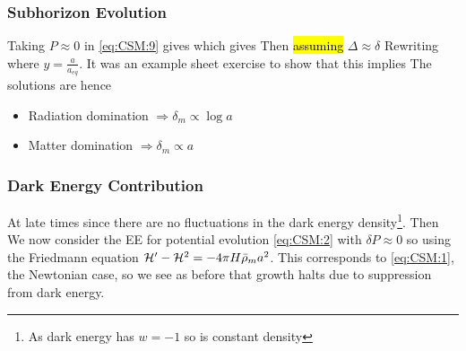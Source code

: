 \documentclass{article}
\begin{document}
\subsubsection*{Subhorizon Evolution} 
Taking $P\approx 0$ in \ref{eq:CSM:9} gives 
which gives 
Then \hl{assuming} $\Delta \approx \delta $ 
Rewriting 
where $y = \frac{a}{a_{eq}}$. It was an example sheet exercise to show that this implies 
The solutions are 
hence 
\begin{itemize}
    \item Radiation domination $ \Rightarrow \delta_m \propto \log a$ 
    \item Matter domination $ \Rightarrow \delta_m \propto a$
\end{itemize}


\subsubsection*{Dark Energy Contribution} At late times 
since there are no fluctuations in the dark energy density\footnote{As dark energy has $w = -1$ so is constant density}. Then 
We now consider the EE for potential evolution \ref{eq:CSM:2} with $\delta P \approx 0$ so 
using the Friedmann equation $ \mathcal{H}^\prime - \mathcal{H}^2 = -4 \pi H \bar{\rho}_m a^2$. This corresponds to \ref{eq:CSM:1}, the Newtonian case, so we see as before that growth halts due to suppression from dark energy. 
\end{document}
